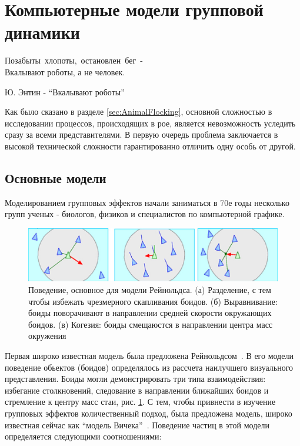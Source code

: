 \section{Компьютерные модели групповой динамики} %
\label{sec:ComputerModelsOfHords}

\epigraph{Позабыты~хлопоты,~остановлен~бег~- \\
Вкалывают роботы, а не человек.}{Ю. Энтин - ``Вкалывают роботы''}
Как было сказано в разделе \ref{sec:AnimalFlocking}, основной сложностью в исследовании процессов, происходящих в рое, является невозможность уследить сразу за всеми представителями. В первую очередь проблема заключается в высокой технической сложности гарантированно отличить одну особь от другой.

    \subsection{Основные модели} %
    \label{sub:CompModelsBasics}
    Моделированием групповых эффектов начали заниматься в 70е годы несколько групп ученых - биологов, физиков и специалистов по компьютерной графике. 
    \begin{figure}
        \centering
        \includegraphics[width=\textwidth]{Fig31_CollectiveMotion}
        \caption{Поведение, основное для модели Рейнольдса. (а) Разделение, с тем чтобы избежать чрезмерного скапливания боидов. (б) Выравнивание: боиды поворачивают в направлении средней скорости окружающих боидов. (в) Когезия: боиды смещаюстся в направлении центра масс окружения}
        \label{fig:ReynoldsModel}
    \end{figure}
    Первая широко известная модель была предложена Рейнольдсом~\cite{reynolds1987}. В его модели поведение обьектов (боидов) определялось из рассчета наилучшего визуального представления. Боиды могли демонстрировать три типа взаимодействия: избегание столкновений, следование в направлении ближайших боидов и стремление к центру масс стаи, рис. \ref{fig:ReynoldsModel}. С тем, чтобы привнести в изучение групповых эффектов количественный подход, была предложена модель, широко известная сейчас как ``модель Вичека''~\cite{vicsek1995}. Поведение частиц в этой модели определяется следующими соотношениями:
